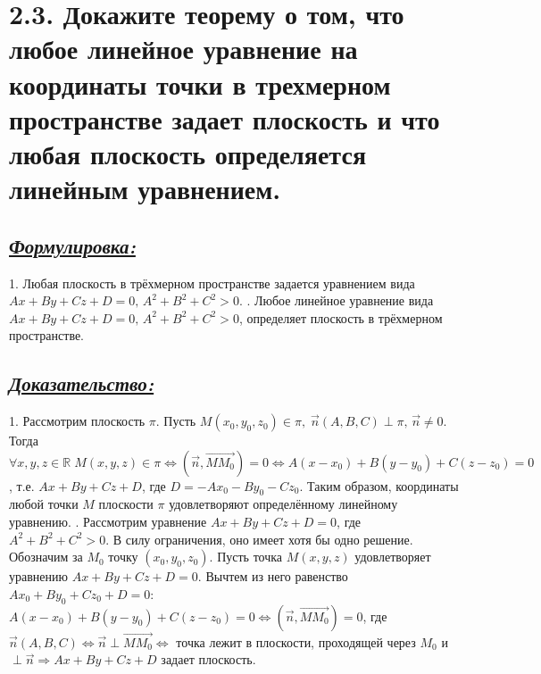 \documentclass{article}
\begin{document}
\section*{\LARGE 2.3. Докажите теорему о том, что любое линейное уравнение на координаты точки в трехмерном пространстве задает плоскость и что любая плоскость определяется линейным уравнением. }
\subsection*{\Large \underline{\textit{Формулировка: }}}
1. Любая плоскость в трёхмерном пространстве задается уравнением вида $Ax + By + Cz + D = 0,\, A^2 + B^2 + C^2 > 0$.
. Любое линейное уравнение вида $Ax + By + Cz + D = 0,\, A^2 + B^2 + C^2 > 0$, определяет плоскость в трёхмерном пространстве.

\subsection*{\Large \underline{\textit{Доказательство: }}}
1. Рассмотрим плоскость $\pi$. Пусть $M(x_0, y_0, z_0) \in \pi,\; \vec{n}(A, B, C) \perp \pi,\, \vec{n} \ne 0$. Тогда $\forall x,y,z \in \mathbb{R} \; M(x, y, z) \in \pi \Leftrightarrow (\vec{n}, \overrightarrow{MM_0}) = 0 \Leftrightarrow A(x - x_0) + B(y - y_0) + C(z - z_0) = 0$, т.е. $Ax + By + Cz + D$, где $D = -Ax_0 - By_0 - Cz_0$. Таким образом, координаты любой точки $M$ плоскости $\pi$ удовлетворяют определённому линейному уравнению.
. Рассмотрим уравнение $Ax + By + Cz + D = 0$, где $A^2 + B^2 + C^2 > 0$. В силу ограничения, оно имеет хотя бы одно решение. Обозначим за $M_0$ точку $(x_0, y_0, z_0)$. Пусть точка $M(x, y, z)$ удовлетворяет уравнению $Ax + By + Cz + D = 0$. Вычтем из него равенство $Ax_0 + By_0 + Cz_0 + D = 0$: $A(x - x_0) + B(y - y_0) + C(z - z_0) = 0 \Leftrightarrow (\vec{n}, \overrightarrow{MM_0}) = 0$, где $\vec{n}(A, B, C) \Leftrightarrow \vec{n} \perp \overrightarrow{MM_0} \Leftrightarrow$ точка лежит в плоскости, проходящей через $M_0$ и $\perp \vec{n} \Rightarrow Ax + By + Cz + D$ задает плоскость.

\end{document}
